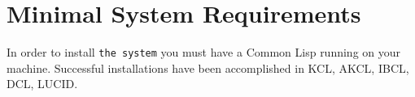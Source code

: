 \section{Minimal System Requirements}
\label{requirements}

In order to install {\tt the system} you must have a Common Lisp running
on your machine.
Successful installations have been accomplished in KCL, AKCL, IBCL, DCL, LUCID.
